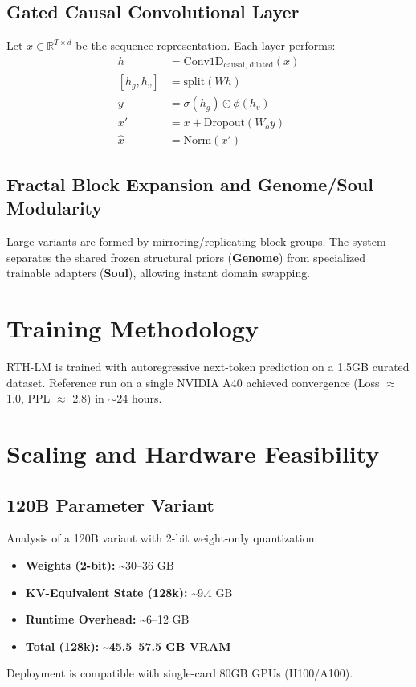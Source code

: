 \documentclass[11pt,a4paper]{article}
\begin{document}
\subsection{Gated Causal Convolutional Layer}
Let $x \in \mathbb{R}^{T \times d}$ be the sequence representation. Each layer performs:
\begin{align}
    h &= \text{Conv1D}_{\text{causal, dilated}}(x) \\
    [h_g, h_v] &= \text{split}(W h) \\
    y &= \sigma(h_g) \odot \phi(h_v) \\
    x' &= x + \text{Dropout}(W_o y) \\
    \hat{x} &= \text{Norm}(x')
\end{align}

\subsection{Fractal Block Expansion and Genome/Soul Modularity}
Large variants are formed by mirroring/replicating block groups. The system separates the shared frozen structural priors (\textbf{Genome}) from specialized trainable adapters (\textbf{Soul}), allowing instant domain swapping.

\section{Training Methodology}
RTH-LM is trained with autoregressive next-token prediction on a 1.5GB curated dataset. Reference run on a single NVIDIA A40 achieved convergence (Loss $\approx$ 1.0, PPL $\approx$ 2.8) in $\sim$24 hours.

\section{Scaling and Hardware Feasibility}
\subsection{120B Parameter Variant}
Analysis of a 120B variant with 2-bit weight-only quantization:
\begin{itemize}
    \item \textbf{Weights (2-bit):} \textasciitilde{}30--36 GB
    \item \textbf{KV-Equivalent State (128k):} \textasciitilde{}9.4 GB
    \item \textbf{Runtime Overhead:} \textasciitilde{}6--12 GB
    \item \textbf{Total (128k):} \textbf{\textasciitilde{}45.5--57.5 GB VRAM}
\end{itemize}
Deployment is compatible with single-card 80GB GPUs (H100/A100).
\end{document}
